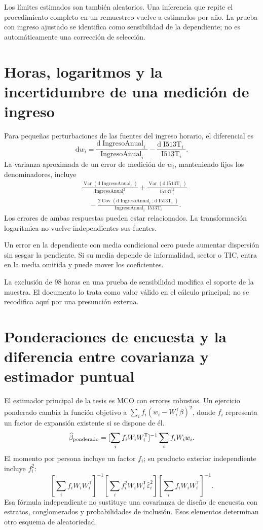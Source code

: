\documentclass[11pt,a4paper]{article}
\DeclareMathOperator{\Var}{Var}
\DeclareMathOperator{\Cov}{Cov}
\begin{document}
Los límites estimados son también aleatorios. Una inferencia que repite el procedimiento completo en un remuestreo vuelve a estimarlos por año. La prueba con ingreso ajustado se identifica como sensibilidad de la dependiente; no es automáticamente una corrección de selección.

\clearpage
\section{Horas, logaritmos y la incertidumbre de una medición de ingreso}

Para pequeñas perturbaciones de las fuentes del ingreso horario, el diferencial es
\[
\mathrm dw_i=
\frac{\mathrm d\operatorname{IngresoAnual}_i}{\operatorname{IngresoAnual}_i}
-\frac{\mathrm d\operatorname{I513T}_i}{\operatorname{I513T}_i}.
\]
La varianza aproximada de un error de medición de $w_i$, manteniendo fijos los denominadores, incluye
\[
\begin{aligned}
&\frac{\Var(\mathrm d\operatorname{IngresoAnual}_i)}
{\operatorname{IngresoAnual}_i^2}
+\frac{\Var(\mathrm d\operatorname{I513T}_i)}
{\operatorname{I513T}_i^2}\\
&\quad-
\frac{2\Cov(\mathrm d\operatorname{IngresoAnual}_i,
\mathrm d\operatorname{I513T}_i)}
{\operatorname{IngresoAnual}_i\operatorname{I513T}_i}.
\end{aligned}
\]
Los errores de ambas respuestas pueden estar relacionados. La transformación logarítmica no vuelve independientes sus fuentes.

Un error en la dependiente con media condicional cero puede aumentar dispersión sin sesgar la pendiente. Si su media depende de informalidad, sector o TIC, entra en la media omitida y puede mover los coeficientes.

La exclusión de 98 horas en una prueba de sensibilidad modifica el soporte de la muestra. El documento lo trata como valor válido en el cálculo principal; no se recodifica aquí por una presunción externa.

\clearpage
\section{Ponderaciones de encuesta y la diferencia entre covarianza y estimador puntual}

El estimador principal de la tesis es MCO con errores robustos. Un ejercicio ponderado cambia la función objetivo a
$\sum_i f_i(w_i-W_i^{\mathsf T}\beta)^2$, donde $f_i$ representa un factor de expansión existente si se dispone de él.
\[
\widehat\beta_{\rm ponderado}
=[\sum_if_iW_iW_i^{\mathsf T}]^{-1}\sum_if_iW_iw_i.
\]
El momento por persona incluye un factor $f_i$; su producto exterior independiente incluye $f_i^2$:
\[
[\sum_if_iW_iW_i^{\mathsf T}]^{-1}
[\sum_if_i^2W_iW_i^{\mathsf T}\widehat\varepsilon_i^2]
[\sum_if_iW_iW_i^{\mathsf T}]^{-1}.
\]
Esa fórmula independiente no sustituye una covarianza de diseño de encuesta con estratos, conglomerados y probabilidades de inclusión. Esos elementos determinan otro esquema de aleatoriedad.
\end{document}
